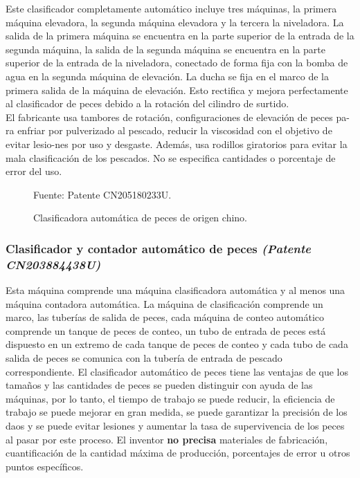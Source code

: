 Este clasificador completamente automático incluye tres máquinas, la primera máquina elevadora, la segunda máquina elevadora y la tercera la niveladora. La salida de la primera máquina se encuentra en la parte superior de la entrada de la segunda máquina, la salida de la segunda máquina se encuentra en la parte superior de la entrada de la niveladora, conectado de forma fija con la bomba de agua en la segunda máquina de elevación. La ducha se fija en el marco de la primera salida de la máquina de elevación. Esto rectifica y mejora perfectamente al clasificador de peces debido a la rotación del cilindro de surtido.\cite{Fang2015} \\
El fabricante usa tambores de rotación, configuraciones de elevación de peces pa-ra enfriar por pulverizado al pescado, reducir la viscosidad con el objetivo de evitar lesio-nes por uso y desgaste. Además, usa rodillos giratorios para evitar la mala clasificación de los pescados. No se especifica cantidades o porcentaje de error del uso.

\begin{figure}[H]
	\centering
	\caption{Clasificadora automática de peces de origen chino.}
	Fuente: Patente CN205180233U.
	\label{fig:clasificadora automatica de peces de origen chino}
\end{figure}

\subsubsection{Clasificador y contador automático de peces \textit{(Patente CN203884438U)}}

Esta máquina comprende una máquina clasificadora automática y al menos una máquina contadora automática. La máquina de clasificación comprende un marco, las tuberías de salida de peces, cada máquina de conteo automático comprende un tanque de peces de conteo, un tubo de entrada de peces está dispuesto en un extremo de cada tanque de peces de conteo y cada tubo de cada salida de peces se comunica con la tubería de entrada de pescado correspondiente. El clasificador automático de peces tiene las ventajas de que los tamaños y las cantidades de peces se pueden distinguir con ayuda de las máquinas, por lo tanto, el tiempo de trabajo se puede reducir, la eficiencia de trabajo se puede mejorar en gran medida, se puede garantizar la precisión de los daos y se puede evitar lesiones y aumentar la tasa de supervivencia de los peces al pasar por este proceso.\cite{Jingwen2014} El inventor \textbf{no precisa} materiales de fabricación, cuantificación de la cantidad máxima de producción, porcentajes de error u otros puntos específicos.


